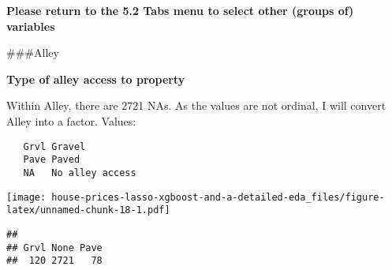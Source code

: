 \documentclass[]{article}
\newenvironment{Shaded}{\begin{snugshade}}{\end{snugshade}}
\newcommand{\DataTypeTok}[1]{\textcolor[rgb]{0.13,0.29,0.53}{#1}}
\newcommand{\DecValTok}[1]{\textcolor[rgb]{0.00,0.00,0.81}{#1}}
\newcommand{\KeywordTok}[1]{\textcolor[rgb]{0.13,0.29,0.53}{\textbf{#1}}}
\newcommand{\NormalTok}[1]{#1}
\newcommand{\OperatorTok}[1]{\textcolor[rgb]{0.81,0.36,0.00}{\textbf{#1}}}
\newcommand{\StringTok}[1]{\textcolor[rgb]{0.31,0.60,0.02}{#1}}
\begin{document}
\textbf{Please return to the 5.2 Tabs menu to select other (groups of)
variables}

\#\#\#Alley

\textbf{Type of alley access to property}

Within Alley, there are 2721 NAs. As the values are not ordinal, I will
convert Alley into a factor. Values:

\begin{verbatim}
   Grvl Gravel
   Pave Paved
   NA   No alley access
\end{verbatim}

\begin{Shaded}
\end{Shaded}

\texttt{[image: house-prices-lasso-xgboost-and-a-detailed-eda\_files/figure-latex/unnamed-chunk-18-1.pdf]}

\begin{Shaded}
\end{Shaded}

\begin{verbatim}
## 
## Grvl None Pave 
##  120 2721   78
\end{verbatim}
\end{document}
